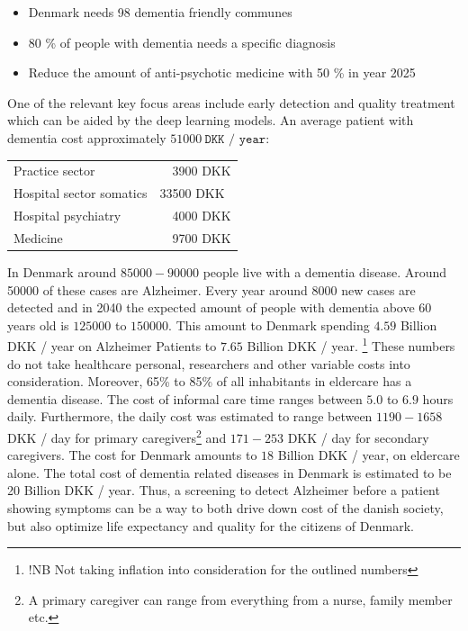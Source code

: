 \documentclass[12pt, fleqn, titlepage]{article}
\begin{document}
\begin{itemize}
	\item Denmark needs 98 dementia friendly communes
	\item 80 \% of people with dementia needs a specific diagnosis 
	\item Reduce the amount of anti-psychotic medicine with 50 \% in year 2025
\end{itemize}
\noindent
One of the relevant key focus areas include early detection and quality treatment which can be aided by the deep learning models. An average patient with dementia cost approximately $ 51000 \ \texttt{DKK / year}$:

		
		\begin{table}[H]
			\begin{tabular}{ll}
				Practice sector   &\ \ 3900  DKK  \\
				Hospital sector somatics  & 33500 DKK \\
				Hospital psychiatry  &  \ \ 4000  DKK  \\
				Medicine & \ \ 9700  DKK 
			\end{tabular}
		\end{table}
		
		In Denmark around $ 85000-90000 $ people live with a dementia disease. Around 50000 of these cases are Alzheimer. Every year around $ 8000 $ new cases are detected and in 2040 the expected amount of people with dementia above 60 years old is $ 125000 $ to $ 150000 $. This amount to Denmark spending $ 4.59 $ Billion DKK / year on Alzheimer Patients to $ 7.65 $ Billion DKK / year. \footnote{!NB Not taking inflation into consideration for the outlined numbers} These numbers do not take healthcare personal, researchers and other variable costs into consideration. Moreover, 65\% to 85\% of all inhabitants in eldercare has a dementia disease. The cost of informal care time ranges between $ 5.0 $ to $ 6.9 $ hours daily. Furthermore, the daily cost was estimated to range between $ 1190 - 1658 $ DKK / day for primary caregivers\footnote{A primary caregiver can range from everything from a nurse, family member etc.} and $ 171 - 253 $ DKK / day for secondary caregivers. The cost for Denmark amounts to $ 18 $ Billion DKK / year, on eldercare alone. The total cost of dementia related diseases in Denmark is estimated to be 20 Billion DKK / year.  \cite{Alzheimerforeningen} \cite{informal_care} Thus, a screening to detect Alzheimer before a patient showing symptoms can be a way to both drive down cost of the danish society, but also optimize life expectancy and quality for the citizens of Denmark.
		
\end{document}

